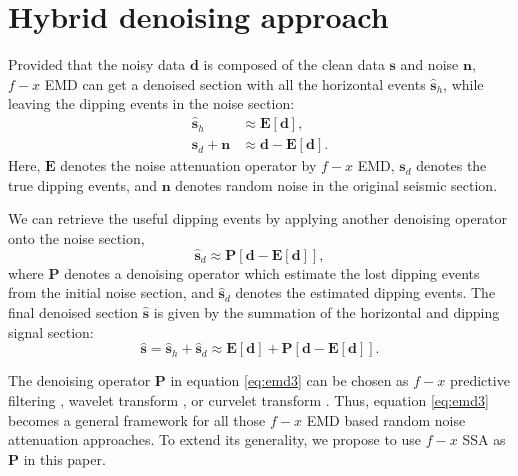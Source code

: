 
\section{Hybrid denoising approach}
Provided that the noisy data $\mathbf{d}$ is composed of the clean data $\mathbf{s}$ and noise $\mathbf{n}$, $f-x$ EMD can get a denoised section with all the horizontal events $\hat{\mathbf{s}}_{h}$, while leaving the dipping events in the noise section: 
\begin{equation}
\label{eq:emd1}
\begin{split}
\hat{\mathbf{s}}_{h} &\approx \mathbf{E}[\mathbf{d}], \\
\mathbf{s}_{d} + \mathbf{n} &\approx \mathbf{d}- \mathbf{E}[\mathbf{d}].
\end{split}
\end{equation}
Here, $\mathbf{E}$ denotes the noise attenuation operator by $f-x$ EMD, $\mathbf{s}_d$ denotes the true dipping events, and $\mathbf{n}$ denotes random noise in the original seismic section.

We can retrieve the useful dipping events by applying another denoising operator onto the noise section,
\begin{equation}
\label{eq:emd3}
\hat{\mathbf{s}}_d \approx \mathbf{P}[ \mathbf{d}- \mathbf{E}[\mathbf{d}] ],
\end{equation}
where $\mathbf{P}$ denotes a denoising operator which estimate the lost dipping events from the initial noise section, and $\hat{\mathbf{s}}_d$ denotes the estimated dipping events. The final denoised section $\hat{\mathbf{s}}$ is given by the summation of the horizontal and dipping signal section:
\begin{equation}
\label{eq:emd4}
\hat{\mathbf{s}} = \hat{\mathbf{s}}_h + \hat{\mathbf{s}}_d \approx \mathbf{E}[\mathbf{d}] + \mathbf{P}[ \mathbf{d}- \mathbf{E}[\mathbf{d}] ].
\end{equation}

The denoising operator $\mathbf{P}$ in equation \ref{eq:emd3} can be chosen as $f-x$ predictive filtering \cite[]{yangkang20132}, wavelet transform \cite[]{chenwei2012}, or curvelet transform \cite[]{lieqian2013}. Thus, equation \ref{eq:emd3} becomes a general framework for all those $f-x$ EMD based random noise attenuation approaches. To extend its generality, we propose to use $f-x$ SSA \cite[]{mssa} as $\mathbf{P}$ in this paper.

